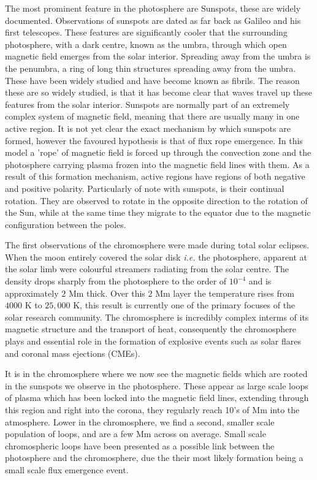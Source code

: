 The most prominent feature in the photosphere are Sunspots, these are widely documented.
Observations of sunspots are dated as far back as Galileo and his first telescopes.
These features are significantly cooler that the surrounding photosphere, with a dark centre, known as the umbra, through which open magnetic field emerges from the solar interior.
Spreading away from the umbra is the penumbra, a ring of long thin structures spreading away from the umbra.
These have been widely studied and have become known as fibrils.
The reason these are so widely studied, is that it has become clear that waves travel up these features from the solar interior.
Sunspots are normally part of an extremely complex system of magnetic field, meaning that there are usually many in one active region.
It is not yet clear the exact mechanism by which sunspots are formed, however the favoured hypothesis is that of flux rope emergence.
In this model a 'rope' of magnetic field is forced up through the convection zone and the photosphere carrying plasma frozen into the magnetic field lines with them.
As a result of this formation mechanism, active regions have regions of both negative and positive polarity.
Particularly of note with sunspots, is their continual rotation.
They are observed to rotate in the opposite direction to the rotation of the Sun, while at the same time they migrate to the equator due to the magnetic configuration between the poles.


The first observations of the chromosphere were made during total solar eclipses.
When the moon entirely covered the solar disk \emph{i.e.} the photosphere, apparent at the solar limb were colourful streamers radiating from the solar centre.
The density drops sharply from the photosphere to the order of $10^{-4}$ and is approximately $2$ Mm thick. 
Over this $2$ Mm layer the temperature rises from $4000$ K to $25,000$ K, this result is currently one of the primary focuses of the solar research community.
The chromosphere is incredibly complex interms of its magnetic structure and the transport of heat, consequently the chromosphere plays and essential role in the formation of explosive events such as solar flares and coronal mass ejections (CMEs).

It is in the chromosphere where we now see the magnetic fields which are rooted in the sunspots we observe in the photosphere.
These appear as large scale loops of plasma which has been locked into the magnetic field lines, extending through this region and right into the corona, they regularly reach 10's of Mm into the atmosphere.
Lower in the chromosphere, we find a second, smaller scale population of loops, and are a few Mm across on average.
Small scale chromospheric loops have been presented as a possible link between the photosphere and the chromosphere, due the their most likely formation being a small scale flux emergence event.

